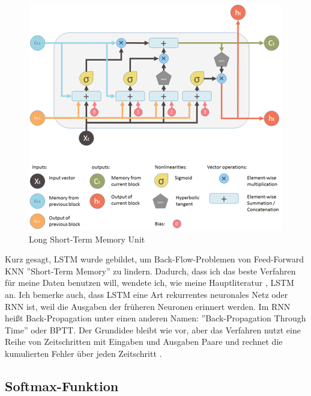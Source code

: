 \documentclass[12pt]{article}
\begin{document}
            \begin{figure}[ht]
            
                \begin{center}

                    \includegraphics[scale=0.6]{lstm-yan.png}
                    \caption{Long Short-Term Memory Unit \cite{yan2016}}
        
                \end{center}
                
            \end{figure}

            Kurz gesagt, LSTM wurde gebildet, um Back-Flow-Problemen von Feed-Forward KNN ''Short-Term Memory'' zu lindern. 
            Dadurch, dass ich das beste Verfahren für meine Daten benutzen will, 
            wendete ich, wie meine Hauptliteratur \cite{zhang2020}, LSTM an. 
            Ich bemerke auch, dass LSTM eine Art rekurrentes neuronales Netz oder RNN ist, 
            weil die Ausgaben der früheren Neuronen erinnert werden. Im RNN heißt Back-Propagation unter einen anderen Namen: 
            ''Back-Propagation Through Time'' oder BPTT. 
            Der Grundidee bleibt wie vor, aber das Verfahren nutzt eine Reihe von Zeitschritten mit Eingaben und Ausgaben Paare und 
            rechnet die kumulierten Fehler über jeden Zeitschritt \cite{brownlee2020}.

        \subsection{Softmax-Funktion}
\end{document}
